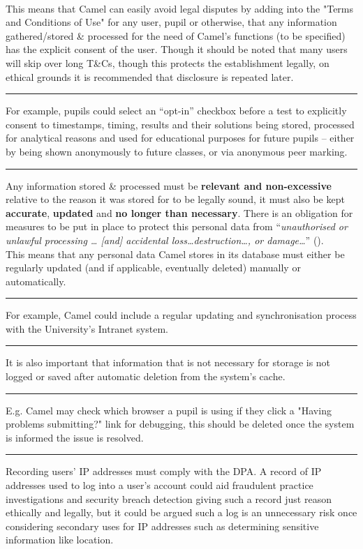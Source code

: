 \\This means that Camel can easily avoid legal disputes by adding into the "Terms and Conditions of Use" for any user, pupil or otherwise, that any information gathered/stored \& processed for the need of Camel’s functions (to be specified) has the explicit consent of the user. Though it should be noted that many users will skip over long T\&Cs, though this protects the establishment legally, on ethical grounds it is recommended that disclosure is repeated later.
\vspace{0.35cm} \hrule {\raggedleft \scriptsize For example, pupils could select an “opt-in” checkbox before a test to explicitly consent to timestamps, timing, results and their solutions being stored, processed for analytical reasons and used for educational purposes for future pupils -- either by being shown anonymously  to future classes, or via anonymous peer marking.\par} \vspace{0.35cm} \hrule
Any information stored \& processed must be \textbf{relevant and non-excessive} relative to the reason it was stored for to be legally sound, it must also be kept \textbf{accurate}, \textbf{updated} and \textbf{no longer than necessary}. There is an obligation for measures to be put in place to protect this personal data from “\textit{unauthorised or unlawful processing … [and] accidental loss\ldots destruction\ldots, or damage\ldots}” (\cite{DPA:tDPP:S1}).
\\This means that any personal data Camel stores in its database must either be regularly updated (and if applicable, eventually deleted) manually or automatically.
\vspace{0.35cm} \hrule {\raggedleft \scriptsize For example, Camel could include a regular updating and synchronisation process with the University's Intranet system. \par} \vspace{0.35cm} \hrule
It is also important that information that is not necessary for storage is not logged or saved after automatic deletion from the system’s cache.
\vspace{0.35cm} \hrule {\raggedleft \scriptsize E.g. Camel may check which browser a pupil is using if they click a "Having problems submitting?" link for debugging, this should be deleted once the system is informed the issue is resolved. \par} \vspace{0.35cm} \hrule
Recording users' IP addresses must comply with the DPA. A record of IP addresses used to log into a user's account could aid fraudulent practice investigations and security breach detection giving such a record just reason ethically and legally, but it could be argued such a log is an unnecessary risk once considering secondary uses for IP addresses such as determining sensitive information like location.
